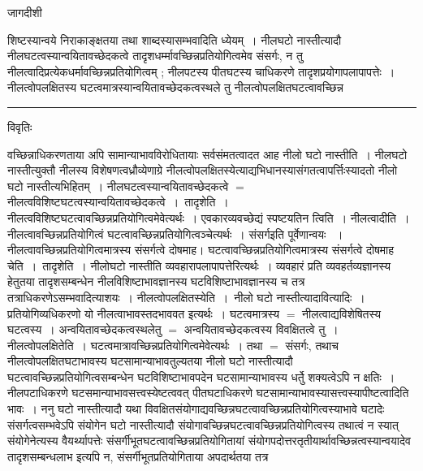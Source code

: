 \documentclass[10pt, openany]{book}
\begin{document}
{\newpage
\begin{center} जागदीशी \end{center}
{\la शिष्टस्यान्वये निराकाङ्क्षतया तथा शाब्दस्यासम्भवादिति ध्येयम्~। नीलघटो
नास्तीत्यादौ नीलघटत्वस्यान्वयितावच्छेदकत्वे तादृशधर्म्मावच्छिन्नप्रतियोगित्वमेव संसर्गः, न तु नीलत्वादिप्रत्येकधर्मावच्छिन्नप्रतियोगित्वम् ;
नीलपटस्य पीतघटस्य चाधिकरणे तादृशप्रयोगापलापापत्तेः~। नीलत्वोपलक्षितस्य
घटत्वमात्रस्यान्वयितावच्छेदकत्वस्थले तु नीलत्वोपलक्षितघटत्वावच्छिन्न}\\
\hrule
\begin{center}     विवृतिः \end{center}
वच्छिन्नाधिकरणताया अपि सामान्याभावविरोधितायाः सर्वसंमतत्वादत आह\textendash 
{\qt नीलो घटो नास्तीति~}। नीलघटो नास्तीत्युक्तौ नीलस्य विशेषणत्वध्रौव्येणाग्रे
नीलत्वोपलक्षितस्येत्याद्यभिधानस्यासंगतत्वापर्त्तिःस्यादतो नीलो घटो
नास्तीत्यभिहितम्~। नीलघटत्वस्यान्वयितावच्छेदकत्वे  $=$ 
नीलत्वविशिष्टघटत्वस्यान्वयितावच्छेदकत्वे~।~{\la तादृशेति~।}
नीलत्वविशिष्टघटत्वावच्छिन्नप्रतियोगित्वमेवेत्यर्थः~।
एवकारव्यवच्छेद्यं स्पष्टयति\textendash न त्विति~। नीलत्वादीति~।
नीलत्वावच्छिन्नप्रतियोगित्वं घटत्वावच्छिन्नप्रतियोगित्वञ्चेत्यर्थः~। {\qt संसर्गइति} पूर्वेणान्वयः
~। नीलत्वावच्छिन्नप्रतियोगित्वमात्रस्य संसर्गत्वे दोषमाह।
घटत्वावच्छिन्नप्रतियोगित्वमात्रस्य संसर्गत्वे दोषमाह चेति~।~{\la तादृशेति~।}
नीलोघटो नास्तीति व्यवहारापलापापत्तेरित्यर्थः~। व्यवहारं प्रति
व्यवहर्तव्यज्ञानस्य हेतुतया तादृशसम्बन्धेन नीलविशिष्टाभावज्ञानस्य घटविशिष्टाभावज्ञानस्य च तत्र
तत्राधिकरणेऽसम्भवादित्याशयः~। {\qt नीलत्वोपलक्षितस्येति~}।~नीलो घटो नास्तीत्यादावित्यादिः~। प्रतियोगिव्यधिकरणो यो नीलत्वाभावस्तदभाववत इत्यर्थः~।
  घटत्वमात्रस्य $=$ नीलत्वाद्यविशेषितस्य घटत्वस्य~। अन्वयितावच्छेदकत्वस्थलेतु $=$ अन्वयितावच्छेदकत्वस्य विवक्षितत्वे तु~। {\qt नीलत्वोपलक्षितेति~}। घटत्वमात्रावच्छिन्नप्रतियोगित्वमेवेत्यर्थः~। तथा $=$ संसर्गः, तथाच
नीलत्वोपलक्षितघटाभावस्य
घटसामान्याभावतुल्यतया नीलो घटो नास्तीत्यादौ
घटत्वावच्छिन्नप्रतियोगित्वसम्बन्धेन घटविशिष्टाभावपदेन घटसामान्याभावस्य  धर्तेु  शक्यत्वेऽपि न क्षतिः~।
नीलपटाधिकरणे घटसमान्याभावसत्त्वस्येष्टत्ववत् पीतघटाधिकरणे घटसामान्याभावस्यासत्त्वस्यापीष्टत्वादिति भावः~। ननु घटो नास्तीत्यादौ यथा विवक्षितसंयोगाद्यवच्छिन्नघटत्वावच्छिन्नप्रतियोगित्वस्याभावे घटादेः
संसर्गत्वसम्भवेऽपि
संयोगेन घटो नास्तीत्यादौ संयोगावच्छिन्नघटत्वावच्छिन्नप्रतियोगित्वस्य
तथात्वं
न स्यात् संयोगेनेत्यस्य वैयर्थ्यापत्तेः
संसर्गीभूतघटत्वावच्छिन्नप्रतियोगितायां
संयोगपदोत्तरतृतीयार्थावच्छिन्नत्वस्यान्वयादेव तादृशसम्बन्धलाभ इत्यपि न,
संसर्गीभूतप्रतियोगिताया अपदार्थतया तत्र
}
\end{document}
